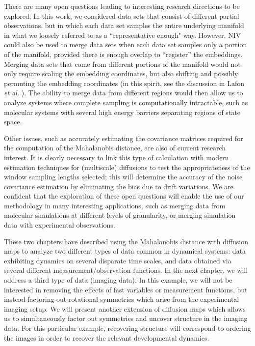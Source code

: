 There are many open questions leading to interesting research directions to be explored.
%
In this work, we considered data sets that consist of different partial observations, but in which each data set samples the entire underlying manifold in
what we loosely referred to as a ``representative enough" way.
%
However, NIV could also be used to merge data sets when each data set samples only a portion of the manifold, provided there is enough overlap to ``register'' the embeddings.
%
Merging data sets that come from different portions of the manifold would not only require scaling the embedding coordinates,
but also shifting and possibly permuting the embedding coordinates (in this spirit, see the discussion in Lafon {\em et al.} \cite{lafon2006data}).
%
The ability to merge data from different regions would then allow us to analyze systems where complete sampling is computationally intractable,
such as molecular systems with several high energy barriers separating regions of state space.

Other issues, such as accurately estimating the covariance matrices required for the computation of the Mahalanobis distance, are also of current research interest.
%
It is clearly necessary to link this type of calculation with modern estimation techniques for (multiscale) diffusions \cite{ait2002maximum, ait2003effects, ait2008closed}
to test the appropriateness of the window sampling lengths selected; this will determine the accuracy of the noise covariance estimation by eliminating
the bias due to drift variations.
%
We are confident that the exploration of these open questions will enable the use of our methodology in many interesting applications, such as merging data from molecular simulations at different levels of granularity, or merging simulation data with experimental observations.

These two chapters have described using the Mahalanobis distance with diffusion maps to analyze two different types of data common in dynamical systems: data exhibiting dynamics on several disparate time scales, and data obtained via several different measurement/observation functions. 
%
In the next chapter, we will address a third type of data (imaging data). 
%
In this example, we will not be interested in removing the effects of fast variables or measurement functions, but instead factoring out rotational symmetries which arise from the experimental imaging setup. 
%
We will present another extension of diffusion maps which allows us to simultaneously factor out symmetries and uncover structure in the imaging data. 
%
For this particular example, recovering structure will correspond to ordering the images in order to recover the relevant developmental dynamics. 


